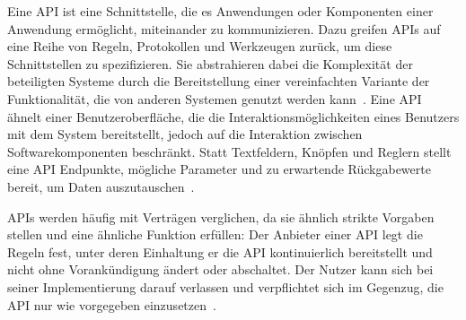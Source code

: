 Eine \ac{API} ist eine Schnittstelle, die es Anwendungen oder Komponenten einer Anwendung ermöglicht, miteinander zu kommunizieren.
Dazu greifen \acp{API} auf eine Reihe von Regeln, Protokollen und Werkzeugen zurück, um diese Schnittstellen zu spezifizieren.
Sie abstrahieren dabei die Komplexität der beteiligten Systeme durch die Bereitstellung einer vereinfachten Variante der Funktionalität, die von anderen Systemen genutzt werden kann~\cite[1]{kul23}.
Eine \ac{API} ähnelt einer Benutzeroberfläche, die die Interaktionsmöglichkeiten eines Benutzers mit dem System bereitstellt, jedoch auf die Interaktion zwischen Softwarekomponenten beschränkt.
Statt Textfeldern, Knöpfen und Reglern stellt eine \ac{API} Endpunkte, mögliche Parameter und zu erwartende Rückgabewerte bereit, um Daten auszutauschen~\cites[351]{de23}{ope23a}.

\acp{API} werden häufig mit Verträgen verglichen, da sie ähnlich strikte Vorgaben stellen und eine ähnliche Funktion erfüllen:
Der Anbieter einer \ac{API} legt die Regeln fest, unter deren Einhaltung er die \ac{API} kontinuierlich bereitstellt und nicht ohne Vorankündigung ändert oder abschaltet.
Der Nutzer kann sich bei seiner Implementierung darauf verlassen und verpflichtet sich im Gegenzug, die \ac{API} nur wie vorgegeben einzusetzen~\cites{ope23a}[1627]{cha21}.